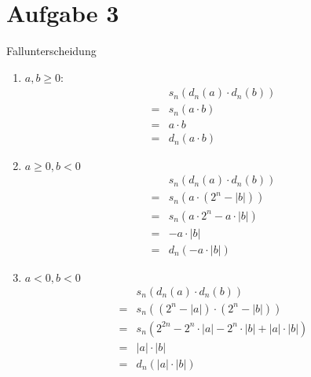 \documentclass{article}
\begin{document}
	\section*{Aufgabe 3}
	Fallunterscheidung
	\begin{enumerate}[1.)]
		\item $a,b \geq 0$:
		\begin{align*}
			&s_n(d_n(a)\cdot d_n(b))\\
			=&s_n(a\cdot b)\\
			=&a\cdot b\\
			=&d_n(a\cdot b)
		\end{align*}
		\item $a\geq 0, b < 0$
		\begin{align*}
			&s_n(d_n(a)\cdot d_n(b))\\
			=&s_n(a \cdot (2^n - |b|))\\
			=&s_n(a \cdot 2^n - a\cdot |b|)\\
			=&-a\cdot |b|\\
			=&d_n(-a\cdot |b|)
		\end{align*}
		\item $a< 0, b< 0$
		\begin{align*}
			&s_n(d_n(a)\cdot d_n(b))\\
			=&s_n((2^n - |a|) \cdot (2^n - |b|))\\
			=&s_n(2^{2n} -2^n\cdot |a| - 2^n \cdot |b| + |a|\cdot |b|)\\
			=&|a|\cdot |b|\\
			=&d_n(|a|\cdot |b|)
		\end{align*}
	\end{enumerate}
\end{document}
